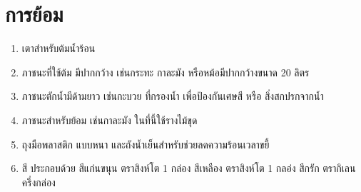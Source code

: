 \section{การย้อม}

\begin{enumerate}
\def\labelenumi{(\arabic{enumi})}
\item
  เตาสำหรับต้มน้ำร้อน
\item
  ภาชนะที่ใช้ต้ม มีปากกว้าง เช่นกระทะ กาละมัง หรือหม้อมีปากกว้างขนาด 20 ลิตร
\item
  ภาชนะตักน้ำมีด้ามยาว เช่นกะบวย ที่กรองน้ำ เพื่อป้องกันเศษสี หรือ สิ่งสกปรกจากน้ำ
\item
  ภาชนะสำหรับย้อม เช่นกาละมัง ในที่นี้ใช้รางไม้ขุด
\item
  ถุงมือพลาสติก แบบหนา และถังน้ำเย็นสำหรับช่วยลดความร้อนเวลาขยี้
\item
  สี ประกอบด้วย สีแก่นขนุน ตราสิงห์โต 1 กล่อง สีเหลือง ตราสิงห์โต 1 กลอ่ง สีกรัก
  ตรากิเลน ครึ่งกล่อง
\end{enumerate}


